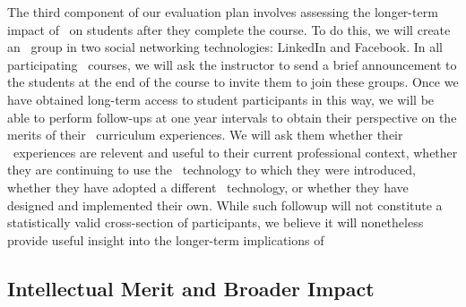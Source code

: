 The third component of our evaluation plan involves assessing the
longer-term impact of \eCT\ on students after they complete the course. To
do this, we will create an \eCT\ group in two social networking
technologies: LinkedIn and Facebook.  In all participating \eCT\ courses,
we will ask the instructor to send a brief announcement to the students at
the end of the course to invite them to join these groups.  Once we have
obtained long-term access to student participants in this way, we will be
able to perform follow-ups at one year intervals to obtain their
perspective on the merits of their \eCT\ curriculum experiences. We will
ask them whether their \eCT\ experiences are relevent and useful to their
current professional context, whether they are continuing to use the \eCT\
technology to which they were introduced, whether they have adopted a
different \eCT\ technology, or whether they have designed and implemented
their own.  While such followup will not constitute a statistically valid
cross-section of participants, we believe it will nonetheless provide
useful insight into the longer-term implications of

\subsection{Intellectual Merit and Broader Impact}

